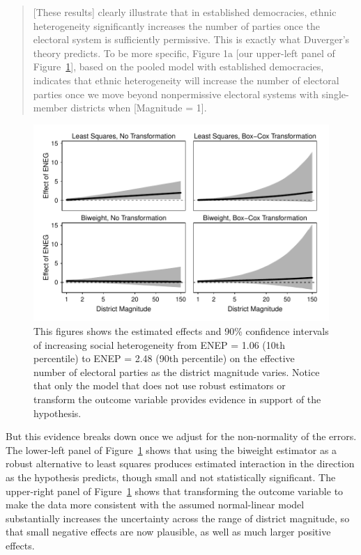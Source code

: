 \documentclass[12pt]{article}
\begin{document}
\begin{quote}
[These results] clearly illustrate that in established democracies, ethnic heterogeneity significantly increases the number of parties once the electoral system is sufficiently permissive. 
This is exactly what Duverger's theory predicts. 
To be more specific, Figure 1a [our upper-left panel of Figure~\ref{fig:cg-fd-plots}], based on the pooled model with established democracies, indicates that ethnic heterogeneity will increase the number of electoral parties once we move beyond nonpermissive electoral systems with single-member districts when [Magnitude = 1].
\end{quote}

\begin{figure}[h!]
\begin{center}
\includegraphics[width = \textwidth]{figs/cg-fd-plots.pdf}
\caption{This figures shows the estimated effects and 90\% confidence intervals of increasing social heterogeneity from ENEP = 1.06 (10th percentile) to ENEP = 2.48 (90th percentile) on the effective number of electoral parties as the district magnitude varies. 
Notice that only the model that does not use robust estimators or transform the outcome variable provides evidence in support of the hypothesis.}\label{fig:cg-fd-plots}
\end{center}
\end{figure}

But this evidence breaks down once we adjust for the non-normality of the errors. 
The lower-left panel of Figure~\ref{fig:cg-fd-plots} shows that using the biweight estimator as a robust alternative to least squares produces estimated interaction in the  direction as the hypothesis predicts, though small and not statistically significant. 
The upper-right panel of Figure~\ref{fig:cg-fd-plots} shows that transforming the outcome variable to make the data more consistent with the assumed normal-linear model substantially increases the uncertainty across the range of district magnitude, so that small negative effects are now plausible, as well as much larger positive effects. 
\end{document}
